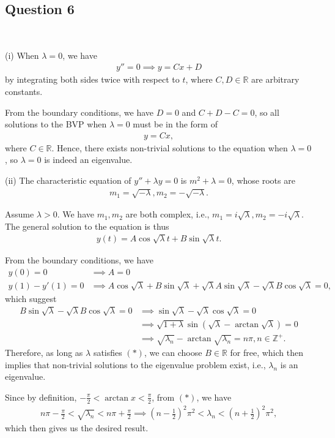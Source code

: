 \documentclass[12pt]{amsart}
\theoremstyle{plain}
\theoremstyle{definition}
\def\mb{\mathbb}
\newcommand{\RA}{\implies}
\begin{document}
\subsection*{Question 6} \ 

(i) When $\lambda=0$, we have
\begin{align*}
	y''=0\RA y=Cx+D
\end{align*}
by integrating both sides twice with respect to $t$, where $C,D\in\mb R$ are arbitrary constants.

From the boundary conditions, we have $D=0$ and $C+D-C=0$, so all solutions to the BVP when $\lambda=0$ must be in the form of
\begin{align*}
	y=Cx,
\end{align*}
where $C\in\mb R$. Hence, there exists non-trivial solutions to the equation when $\lambda=0$, so $\lambda=0$ is indeed an eigenvalue.

(ii) The characteristic equation of $y''+\lambda y=0$ is $m^2+\lambda=0$, whose roots are
\begin{align*}
	m_1=\sqrt{-\lambda},m_2=-\sqrt{-\lambda}.
\end{align*}

Assume $\lambda>0$. We have $m_1,m_2$ are both complex, i.e., $m_1=i\sqrt\lambda,m_2=-i\sqrt{\lambda}$. The general solution to the equation is thus
\begin{align*}
	y(t)=A\cos{\sqrt\lambda t}+B\sin{\sqrt\lambda t}.
\end{align*}

From the boundary conditions, we have
\begin{align*}
	y(0)=0&\RA A=0\\
	y(1)-y'(1)=0&\RA A\cos\sqrt\lambda+B\sin\sqrt\lambda+\sqrt \lambda A\sin\sqrt\lambda-\sqrt\lambda B\cos\sqrt\lambda=0,   
\end{align*}
which suggest
\begin{align*}
	B\sin\sqrt\lambda-\sqrt\lambda B\cos\sqrt\lambda=0&\RA \sin\sqrt\lambda-\sqrt\lambda \cos\sqrt\lambda=0\\
	&\RA \sqrt{1+\lambda}\sin(\sqrt\lambda-\arctan\sqrt\lambda)=0\\
	&\RA \sqrt{\lambda_n}-\arctan\sqrt{\lambda_n}=n\pi, n\in\mb Z^+\tag{$*$}.
\end{align*}
Therefore, as long as $\lambda$ satisfies $(*)$, we can choose $B\in\mb R$ for free, which then implies that non-trivial solutions to the eigenvalue problem exist, i.e., $\lambda_n$ is an eigenvalue.

Since by definition, $\displaystyle -\frac\pi2<\arctan x<\frac\pi2$, from $(*)$, we have
\begin{align*}
	n\pi -\frac\pi 2<\sqrt{\lambda_n}<n\pi +\frac\pi 2\RA \left(n-\frac12\right)^2\pi^2<\lambda_n<\left(n+\frac12\right)^2\pi^2,
\end{align*}
which then gives us the desired result.
\end{document}
